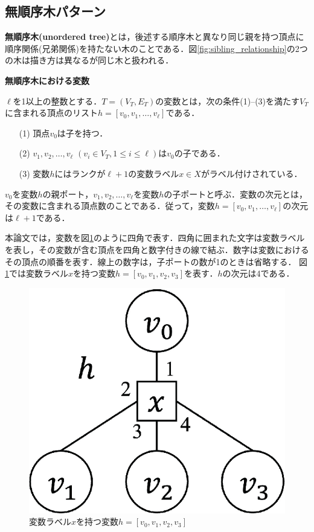 \subsection{無順序木パターン}
\textbf{無順序木(unordered tree)}とは，後述する順序木と異なり同じ親を持つ頂点に順序関係(兄弟関係)を持たない木のことである．図\ref{fig:sibling_relationship}の2つの木は描き方は異なるが同じ木と扱われる．

\begin{define}{\bf 無順序木における変数}\par
  $\ell$を1以上の整数とする．$T=(V_T,E_T)$の変数とは，次の条件(1)--(3)を満たす$V_T$に含まれる頂点のリスト$h=[v_0,v_1,\ldots,v_{\ell}]$である．
  \begin{enumerate}
    \item[(1)] 頂点$v_0$は子を持つ．
    \item[(2)] $v_1,v_2,\ldots,v_{\ell}$ $(v_i \in V_T, 1\leq i\leq \ell)$は$v_0$の子である．%
    \item[(3)] 変数$h$にはランクが$\ell+1$の変数ラベル$x\in X$がラベル付けされている．
  \end{enumerate}
  $v_0$を変数$h$の親ポート，$v_1,v_2,\ldots,v_{\ell}$を変数$h$の子ポートと呼ぶ．変数の次元とは，その変数に含まれる頂点数のことである．従って，変数$h=[v_0,v_1,\ldots,v_{\ell}]$の次元は$\ell+1$である．\par
  本論文では，変数を図\ref{fig:variable}のように四角で表す．四角に囲まれた文字は変数ラベルを表し，その変数が含む頂点を四角と数字付きの線で結ぶ．数字は変数におけるその頂点の順番を表す．線上の数字は，子ポートの数が1のときは省略する．
  図\ref{fig:variable}では変数ラベル$x$を持つ変数$h=[v_0,v_1,v_2,v_3]$を表す．$h$の次元は4である．
\end{define}

\begin{figure}[tb]
  \centering
  \includegraphics[scale=0.28]{fig/fig-variable.eps}
  \caption{変数ラベル$x$を持つ変数$h=[v_0,v_1,v_2,v_3]$}\label{fig:variable}
\end{figure}

